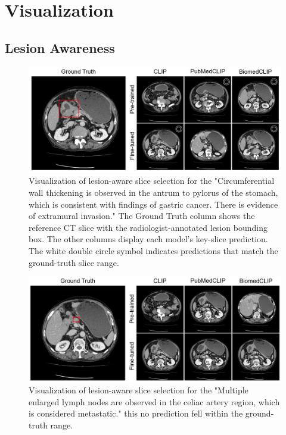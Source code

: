 \documentclass[bioengineering,article,submit,pdftex,moreauthors]{Definitions/mdpi}
\begin{document}
\section{Visualization}\label{app:visualization}
\subsection{Lesion Awareness}

\begin{figure}[ht]
  \centering
  \includegraphics[width=1\textwidth]{./figures/app_lesion_aware_inst6_2.png}
  \caption{Visualization of lesion-aware slice selection for the "Circumferential wall thickening is observed in the antrum to pylorus of the stomach, which is consistent with findings of gastric cancer. 
  There is evidence of extramural invasion."
  The Ground Truth column shows the reference CT slice with the radiologist-annotated lesion bounding box.
  The other columns display each model’s key-slice prediction.
  The white double circle symbol indicates predictions that match the ground-truth slice range.}
  \label{fig:lesion_aware_inst6}
\end{figure}


\begin{figure}[ht]
  \centering
  \includegraphics[width=1\textwidth]{./figures/app_lesion_aware_inst7_2.png}
  \caption{Visualization of lesion-aware slice selection for the "Multiple enlarged lymph nodes are observed in the celiac artery region, which is considered metastatic."
   this  no prediction fell within the ground-truth range.}
  \label{fig:lesion_aware_inst7}
\end{figure}
\end{document}
